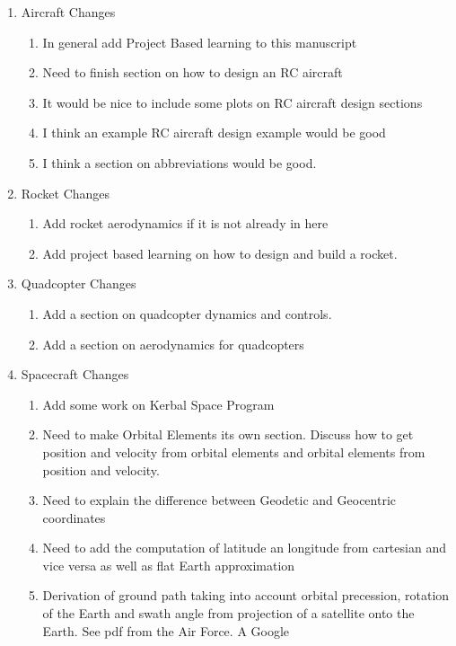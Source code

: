 \documentclass{article}
\begin{document}
\begin{enumerate}[itemsep=-5pt]
  \item Aircraft Changes
    \begin{enumerate}[itemsep=-5pt]
    \item In general add Project Based learning to this manuscript
    \item Need to finish section on how to design an RC aircraft
    \item It would be nice to include some plots on RC aircraft design
      sections
    \item I think an example RC aircraft design example would be good
    \item I think a section on abbreviations would be good.
    \end{enumerate}
  \item Rocket Changes
    \begin{enumerate}[itemsep=-5pt]
    \item Add rocket aerodynamics if it is not already in here
    \item Add project based learning on how to design and build a
      rocket.
    \end{enumerate}
\item Quadcopter Changes
  \begin{enumerate}[itemsep=-5pt]
  \item Add a section on quadcopter dynamics and controls.
  \item Add a section on aerodynamics for quadcopters
  \end{enumerate}
\item Spacecraft Changes
  \begin{enumerate}[itemsep=-5pt]
  \item Add some work on Kerbal Space Program
  \item Need to make Orbital Elements its own section. Discuss how to
    get position and velocity from orbital elements and orbital elements
    from position and velocity.
  \item Need to explain the difference between Geodetic and Geocentric
    coordinates
  \item Need to add the computation of latitude an longitude from
    cartesian and vice versa as well as flat Earth approximation
  \item Derivation of ground path taking into account orbital
    precession, rotation of the Earth and swath angle from projection of
    a satellite onto the Earth. See pdf from the Air Force. A Google

\end{enumerate}
\end{enumerate}
\end{document}
